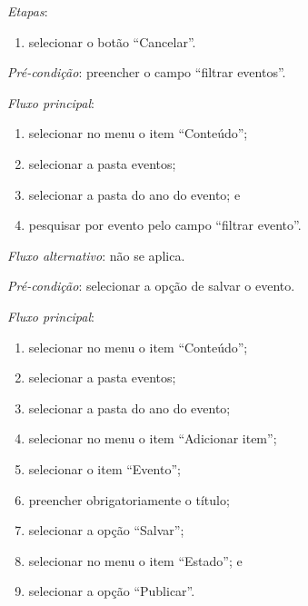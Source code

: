 \noindent \textit{Etapas}:

\begin{enumerate}
    \item selecionar o botão ``Cancelar''.
\end{enumerate}




\vspace{0.7cm}

\noindent \textit{Pré-condição}: preencher o campo ``filtrar eventos''.

\noindent \textit{Fluxo principal}:

\begin{enumerate}
    \item selecionar no menu o item ``Conteúdo'';
    \item selecionar a pasta eventos;
    \item selecionar a pasta do ano do evento; e
    \item pesquisar por evento pelo campo ``filtrar evento''.
\end{enumerate}

\noindent \textit{Fluxo alternativo}: não se aplica.



\vspace{0.7cm}

\noindent \textit{Pré-condição}: selecionar a opção de salvar o evento.

\noindent \textit{Fluxo principal}:

\begin{enumerate}
    \item selecionar no menu o item ``Conteúdo'';
    \item selecionar a pasta eventos;
    \item selecionar a pasta do ano do evento;
    \item selecionar no menu o item ``Adicionar item'';
    \item selecionar o item ``Evento'';
    \item preencher obrigatoriamente o título;
    \item selecionar a opção ``Salvar'';
    \item selecionar no menu o item ``Estado''; e
    \item selecionar a opção ``Publicar''.
\end{enumerate}

